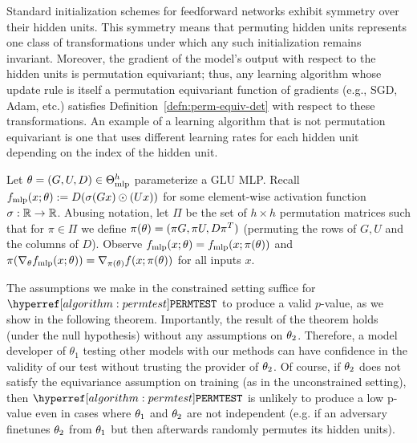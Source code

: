 Standard initialization schemes for feedforward networks exhibit symmetry over their hidden units. This symmetry means that permuting hidden units represents one class of transformations under which any such initialization remains invariant.
Moreover, the gradient of the model's output with respect to the hidden units is permutation equivariant; thus, any learning algorithm whose update rule is itself a permutation equivariant function of gradients (e.g., SGD, Adam, etc.) satisfies Definition~\ref{defn:perm-equiv-det} with respect to these transformations.
An
example of a learning algorithm that is not permutation equivariant is one that uses different learning rates for each hidden unit depending on the index of the hidden unit.

\begin{example}\label{example:permuting-hidden-units} 
    Let $\theta = (G,U,D) \in \Theta_{\textup{mlp}}^h$ parameterize a GLU MLP. Recall $f_{\textup{mlp}}(x ; \theta) := D ( \sigma(Gx) \odot (Ux) )$ for some element-wise activation function $\sigma : \mathbb{R} \to \mathbb{R}$. 
    Abusing notation, let $\Pi$ be the set of $h \times h$ permutation matrices such that for $\pi \in \Pi$ we define $\pi(\theta) = (\pi G, \pi U, D \pi^T )$ (permuting the rows of $G, U$ and the columns of $D$). Observe $f_{\textup{mlp}}(x ; \theta) = f_{\textup{mlp}}(x ; \pi(\theta))$ and $\pi(\nabla_\theta f_{\textup{mlp}}(x;\theta)) = \nabla_{\pi(\theta)} f(x;\pi(\theta))$ for all inputs $x$.
\end{example}

The assumptions we make in the constrained setting suffice for $\permtest$ to produce a valid $p$-value, as we show in the following theorem.
Importantly, the result of the theorem holds (under the null hypothesis) without any assumptions on $\theta_2$. Therefore, a model developer of $\theta_1$ testing other models with our methods can have confidence in the validity of our test without trusting the provider of $\theta_2$.
Of course, if $\theta_2$ does not satisfy the equivariance assumption on training (as in the unconstrained setting), then $\permtest$ is unlikely to produce a low p-value even in cases where $\theta_1$ and $\theta_2$ are not independent (e.g. if an adversary finetunes $\theta_2$ from $\theta_1$ but then afterwards randomly permutes its hidden units).

